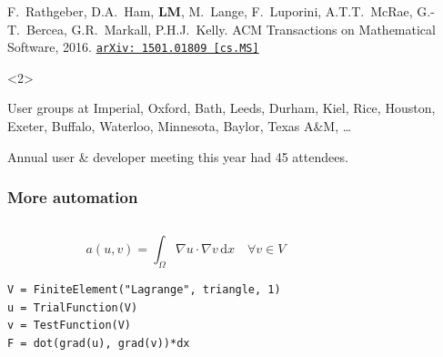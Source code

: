 \documentclass[presentation]{beamer}
\newcommand{\arxivlink}[2]{%
  \href{http://www.arxiv.org/abs/#1}%
  {\texttt{arXiv:\,#1\,[#2]}}%
}
\begin{document}
\begin{frame}
\begin{overlayarea}{\textwidth}{0.8\textheight}
\begin{onlyenv}
    \begin{flushright}
      {\scriptsize F.~Rathgeber, D.A.~Ham, \textbf{LM}, M.~Lange,
        F.~Luporini, A.T.T.~McRae, G.-T.~Bercea, G.R.~Markall,
        P.H.J.~Kelly. ACM Transactions on Mathematical Software,
        2016. \arxivlink{1501.01809}{cs.MS}\nocite{Rathgeber:2016}}
    \end{flushright}
  \end{onlyenv}
  \begin{onlyenv}<2>
    \begin{block}{User groups at}
      Imperial, Oxford, Bath, Leeds, Durham, Kiel, Rice, Houston,
      Exeter, Buffalo, Waterloo, Minnesota, Baylor, Texas A\&M, \dots

      Annual user \& developer meeting this year had 45 attendees.
    \end{block}
  \end{onlyenv}
\end{overlayarea}
\end{frame}


\begin{frame}[fragile]
  \frametitle{More automation}
  \begin{columns}
    \begin{column}{0.5\textwidth}
      \begin{equation*}
        a(u, v) = \int_\Omega \nabla u \cdot \nabla v\,\text{d}x \quad \forall v \in V
      \end{equation*}
\begin{verbatim}
V = FiniteElement("Lagrange", triangle, 1)
u = TrialFunction(V)
v = TestFunction(V)
F = dot(grad(u), grad(v))*dx
\end{verbatim}
    \end{column}
    \hspace{0.1\textwidth}
    \begin{column}{0.3\textwidth}
    \end{column}
  \end{columns}
\end{frame}
\end{document}
